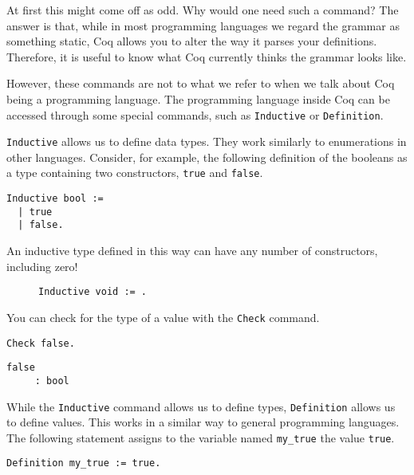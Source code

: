 At first this might come off as odd. Why would one need such a command? The answer is that, while in most
programming languages we regard the grammar as something static, Coq allows you to alter the way it parses
your definitions. Therefore, it is useful to know what Coq currently thinks the grammar looks like. 

However, these commands are not to what we refer to when we talk about Coq being a programming language.
The programming language inside Coq can be accessed through some special commands, such as 
\texttt{Inductive} or \texttt{Definition}.

\texttt{Inductive} allows us to define data types. They work similarly to enumerations in other
languages. Consider, for example, the following definition of the booleans as a type containing two 
constructors, \texttt{true} and \texttt{false}.

\begin{verbatim}
Inductive bool := 
  | true
  | false.
\end{verbatim}

An inductive type defined in this way can have any number of constructors, including zero!

\begin{figure}[!ht]
\begin{verbatim}
Inductive void := .
\end{verbatim}
\label{lst:void}
\end{figure}

You can check for the type of a value with the \texttt{Check} command.

\begin{verbatim}
Check false. 
\end{verbatim}
\vspace{-\baselineskip*3/2}
\begin{verbatim}
false
     : bool
\end{verbatim}

While the \texttt{Inductive} command allows us to define types, \texttt{Definition}
allows us to define values. This works in a similar way to general programming languages. The 
following statement assigns to the variable named \texttt{my_true} the value 
\texttt{true}.

\begin{verbatim}
Definition my_true := true.
\end{verbatim}

